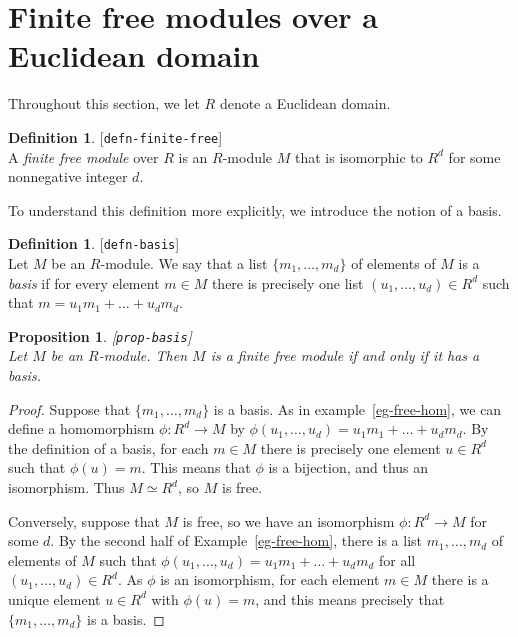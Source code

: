 \documentclass{amsart}
\newcommand{\lbl}[1]{\label{#1}\textup{[\texttt{#1}]}\ \\}
\newcommand{\lbl}{\label}
\newcommand{\xra}       {\xrightarrow}
\renewcommand{\:}{\colon}
\newtheorem{proposition}[theorem]{Proposition}
\theoremstyle{definition}
\newtheorem{definition}[theorem]{Definition}
\begin{document}
\section{Finite free modules over a Euclidean domain}
\label{sec-free}

Throughout this section, we let $R$ denote a Euclidean domain.

\begin{definition}\lbl{defn-finite-free}
 A \emph{finite free module} over $R$ is an $R$-module $M$ that is
 isomorphic to $R^d$ for some nonnegative integer $d$.
\end{definition}

To understand this definition more explicitly, we introduce the notion
of a basis.
\begin{definition}\lbl{defn-basis}
 Let $M$ be an $R$-module.  We say that a list $\{m_1,\ldots,m_d\}$ of
 elements of $M$ is a \emph{basis} if for every element $m\in M$ there
 is precisely one list $(u_1,\ldots,u_d)\in R^d$ such that
 $m=u_1m_1+\ldots+u_dm_d$.
\end{definition}
\begin{proposition}\lbl{prop-basis}
 Let $M$ be an $R$-module.  Then $M$ is a finite free module if and
 only if it has a basis.  
\end{proposition}
\begin{proof}
 Suppose that $\{m_1,\ldots,m_d\}$ is a basis.  As in
 example~\ref{eg-free-hom}, we can define a homomorphism
 $\phi\:R^d\xra{}M$ by $\phi(u_1,\ldots,u_d)=u_1m_1+\ldots+u_dm_d$.
 By the definition of a basis, for each $m\in M$ there is precisely
 one element $u\in R^d$ such that $\phi(u)=m$.  This means that $\phi$
 is a bijection, and thus an isomorphism.  Thus $M\simeq R^d$, so $M$
 is free.

 Conversely, suppose that $M$ is free, so we have an isomorphism
 $\phi\:R^d\xra{}M$ for some $d$.  By the second half of
 Example~\ref{eg-free-hom}, there is a list $m_1,\ldots,m_d$ of
 elements of $M$ such that $\phi(u_1,\ldots,u_d)=u_1m_1+\ldots+u_dm_d$
 for all $(u_1,\ldots,u_d)\in R^d$.  As $\phi$ is an isomorphism, for
 each element $m\in M$ there is a unique element $u\in R^d$ with
 $\phi(u)=m$, and this means precisely that $\{m_1,\ldots,m_d\}$ is a
 basis. 
\end{proof}
\end{document}
